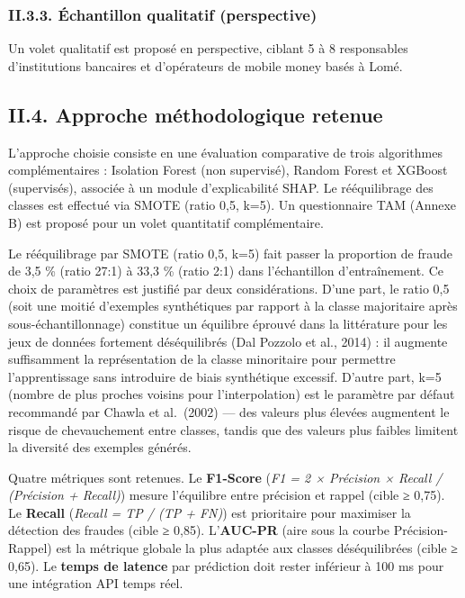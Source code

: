 \documentclass[
  12pt,
]{article}
\begin{document}
\subsubsection{II.3.3. Échantillon qualitatif
(perspective)}\label{ii.3.3.-uxe9chantillon-qualitatif-perspective}

Un volet qualitatif est proposé en perspective, ciblant 5 à 8
responsables d’institutions bancaires et d’opérateurs de mobile money
basés à Lomé.

\subsection{II.4. Approche méthodologique
retenue}\label{ii.4.-approche-muxe9thodologique-retenue}

L’approche choisie consiste en une évaluation comparative de trois
algorithmes complémentaires : Isolation Forest (non supervisé), Random
Forest et XGBoost (supervisés), associée à un module d’explicabilité
SHAP. Le rééquilibrage des classes est effectué via SMOTE (ratio 0,5,
k=5). Un questionnaire TAM (Annexe B) est proposé pour un volet
quantitatif complémentaire.

Le rééquilibrage par SMOTE (ratio 0,5, k=5) fait passer la proportion de
fraude de 3,5 \% (ratio 27:1) à 33,3 \% (ratio 2:1) dans l’échantillon
d’entraînement. Ce choix de paramètres est justifié par deux
considérations. D’une part, le ratio 0,5 (soit une moitié d’exemples
synthétiques par rapport à la classe majoritaire après
sous-échantillonnage) constitue un équilibre éprouvé dans la littérature
pour les jeux de données fortement déséquilibrés (Dal Pozzolo et al.,
2014) : il augmente suffisamment la représentation de la classe
minoritaire pour permettre l’apprentissage sans introduire de biais
synthétique excessif. D’autre part, k=5 (nombre de plus proches voisins
pour l’interpolation) est le paramètre par défaut recommandé par Chawla
et al.~(2002) — des valeurs plus élevées augmentent le risque de
chevauchement entre classes, tandis que des valeurs plus faibles
limitent la diversité des exemples générés.

Quatre métriques sont retenues. Le \textbf{F1-Score} (\emph{F1 = 2 ×
Précision × Recall / (Précision + Recall)}) mesure l’équilibre entre
précision et rappel (cible ≥ 0,75). Le \textbf{Recall} (\emph{Recall =
TP / (TP + FN)}) est prioritaire pour maximiser la détection des fraudes
(cible ≥ 0,85). L’\textbf{AUC-PR} (aire sous la courbe Précision-Rappel)
est la métrique globale la plus adaptée aux classes déséquilibrées
(cible ≥ 0,65). Le \textbf{temps de latence} par prédiction doit rester
inférieur à 100 ms pour une intégration API temps réel.
\end{document}
